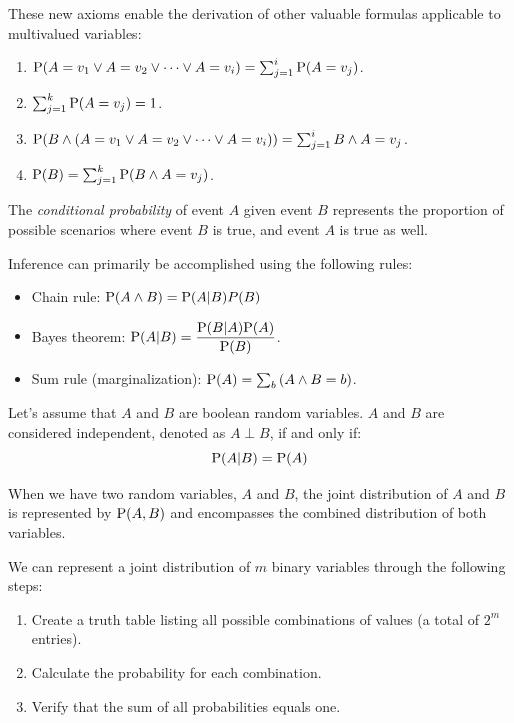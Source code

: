 \documentclass[12pt, a4paper]{report}
\begin{document}
    These new axioms enable the derivation of other valuable formulas applicable to multivalued variables:    \begin{enumerate}
        \item $\textnormal{P}(A=v_1 \lor A=v_2 \lor \dots \lor A=v_i)=\sum_{j=1}^{i}{\textnormal{P}(A=v_j)}$.
        \item $\sum_{j=1}^{k}{\textnormal{P}(A=v_j)}=1$. 
        \item $\textnormal{P}(B \land (A=v_1 \lor A=v_2 \lor \dots \lor A=v_i))=\sum_{j=1}^{i}{B \land A=v_j}$. 
        \item $\textnormal{P}(B)=\sum_{j=1}^{k}{\textnormal{P}(B \land A=v_j)}$.
    \end{enumerate}
    \begin{definition}
        The \emph{conditional probability} of event $A$ given event $B$ represents the proportion of possible scenarios where event $B$ is true, and event $A$ is true as well.
    \end{definition}
    Inference can primarily be accomplished using the following rules:
    \begin{itemize}
        \item Chain rule: $\textnormal{P}(A \land B)=\textnormal{P}(A|B)P(B)$
        \item Bayes theorem: $\textnormal{P}(A|B)=\dfrac{\textnormal{P}(B|A)\textnormal{P}(A)}{\textnormal{P}(B)}$.
        \item Sum rule (marginalization): $\textnormal{P}(A)=\sum_{b}{(A \land B=b)}$.
    \end{itemize}
    \begin{definition}
        Let's assume that $A$ and $B$ are boolean random variables. $A$ and $B$ are considered independent, denoted as $A \perp B$, if and only if:
        \[\textnormal{P}(A|B)=\textnormal{P}(A)\]

        When we have two random variables, $A$ and $B$, the joint distribution of $A$ and $B$ is represented by $\textnormal{P}(A, B)$ and encompasses the combined distribution of both variables.    
    \end{definition}
    We can represent a joint distribution of $m$ binary variables through the following steps:
    \begin{enumerate}
        \item Create a truth table listing all possible combinations of values (a total of $2^m$ entries).
        \item Calculate the probability for each combination.
        \item Verify that the sum of all probabilities equals one.
    \end{enumerate}
\end{document}
